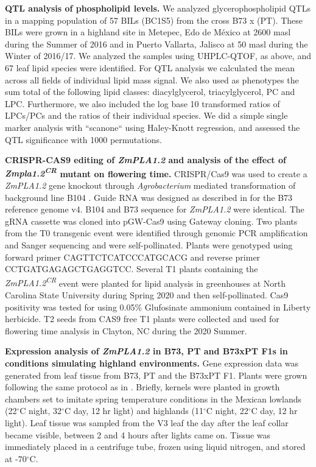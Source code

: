 \documentclass[9pt,twocolumn,twoside,lineno]{BioRxiv}
\begin{document}
\textbf{QTL analysis of phospholipid levels.}
We analyzed glycerophospholipid QTLs in a mapping population of 57 BILs (BC1S5) from the cross B73 x (PT).
These BILs were grown in a highland site in Metepec, Edo de M\'exico at 2600 masl during the Summer of 2016 and in Puerto Vallarta, Jalisco at 50 masl during the Winter of 2016/17.  
We analyzed the samples using UHPLC-QTOF, as above, and 67 leaf lipid species were identified.
For QTL analysis we calculated the mean across all fields of individual lipid mass signal. 
We also used as phenotypes the sum total of the following lipid classes: diacylglycerol, triacylglycerol, PC and  LPC.  
Furthermore,  we also included the log base 10 transformed ratios of LPCs/PCs and the ratios of their individual species. 
We did a simple single marker analysis  with ``scanone`` using Haley-Knott  regression, and assessed the QTL significance with 1000 permutations.

\textbf{CRISPR-CAS9 editing of \textit{ZmPLA1.2} and analysis of the effect of \textit{Zmpla1.2\textsuperscript{CR}} mutant on flowering time.}
CRISPR/Cas9 was used to create a \textit{ZmPLA1.2} gene knockout through \textit{Agrobacterium} mediated transformation of background line B104 \cite{Wu2020-nq, Char2017-uk}. 
Guide RNA was designed as described in \cite{Brazelton2015-co} for the B73 reference genome v4. 
B104 and B73 sequence for \textit{ZmPLA1.2} were identical. 
The gRNA cassette was cloned into pGW-Cas9 using Gateway cloning. 
Two plants from the T0 transgenic event were identified through genomic PCR amplification and Sanger sequencing and were self-pollinated. 
Plants were genotyped using forward primer CAGTTCTCATCCCATGCACG and reverse primer CCTGATGAGAGCTGAGGTCC.
Several T1 plants containing the \textit{ZmPLA1.2\textsuperscript{CR}} event were  planted for lipid analysis in greenhouses at  North Carolina State University during Spring 2020 and then self-pollinated. 
Cas9 positivity was tested for using 0.05\% Glufosinate ammonium contained in Liberty herbicide. 
T2 seeds from CAS9 free T1 plants were collected and used for flowering time analysis in  Clayton, NC during the 2020 Summer.  %

\textbf{Expression analysis of \textit{ZmPLA1.2} in B73, PT and B73xPT F1s in conditions simulating highland environments.}
Gene expression data was generated from leaf tissue from B73, PT and the B73xPT F1. 
Plants were grown following the same protocol as in \cite{Crow2020-gene}.
Briefly, kernels were planted in growth chambers set to imitate spring temperature conditions in the Mexican lowlands (22$^{\circ}$C night, 32$^{\circ}$C day, 12 hr light) and highlands (11$^{\circ}$C night, 22$^{\circ}$C day, 12 hr light). 
Leaf tissue was sampled from the V3 leaf the day after the leaf collar became visible, between 2 and 4 hours after lights came on. Tissue was immediately placed in a centrifuge tube, frozen using liquid nitrogen, and stored at -70$^{\circ}$C.
\end{document}
